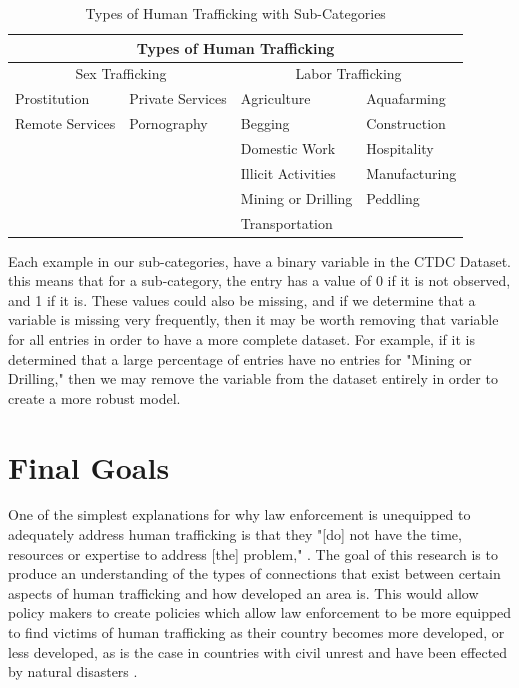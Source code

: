 \documentclass{article} %
\begin{document}
\FloatBarrier
\begin{table}[htb]
	\begin{tabular}{ |p{3cm}|p{3cm}||p{3cm}|p{3cm}|  }
		\hline
		\multicolumn{4}{|c|}{Types of Human Trafficking}                                 \\ \hline
		\multicolumn{2}{|c||}{Sex Trafficking} & \multicolumn{2}{|c|}{Labor Trafficking} \\ \hline
		Prostitution    & Private Services     & Agriculture        & Aquafarming        \\
		Remote Services & Pornography          & Begging            & Construction       \\
		&                      & Domestic Work      & Hospitality        \\
		&                      & Illicit Activities & Manufacturing      \\
		&                      & Mining or Drilling & Peddling           \\
		&                      & Transportation     &                    \\ \hline
	\end{tabular}
	\caption{Types of Human Trafficking with Sub-Categories}
\end{table}
\FloatBarrier

Each example in our sub-categories, have a binary variable in the CTDC Dataset. this means that for a sub-category, the entry has a value of 0 if it is not observed, and 1 if it is. These values could also be missing, and if we determine that a variable is missing very frequently, then it may be worth removing that variable for all entries in order to have a more complete dataset. For example, if it is determined that a large percentage of entries have no entries for "Mining or Drilling," then we may remove the variable from the dataset entirely in order to create a more robust model.


\section{Final Goals}

One of the simplest explanations for why law enforcement is unequipped to adequately address human trafficking is that they "[do] not have the time,
resources or expertise to address [the] problem," \parencite{LawResponse}. The goal of this research is to produce an understanding of the types of connections that exist between certain aspects of human trafficking and how developed an area is. This would allow policy makers to create policies which allow law enforcement to be more equipped to find victims of human trafficking as their country becomes more developed, or less developed, as is the case in countries with civil unrest and have been effected by natural disasters \parencite{bar2010}.


\printbibliography
\end{document}
